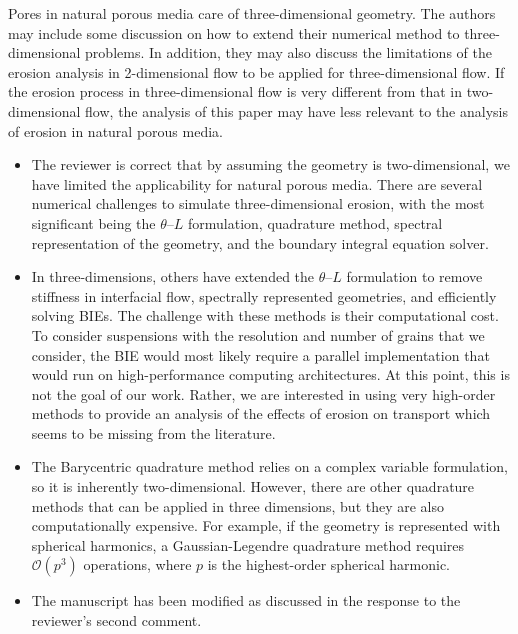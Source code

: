 \documentclass[11pt]{article}
\newcommand{\comment}[1]{{\color{blue} #1}}
\begin{document}
\noindent
\comment{Pores in natural porous media care of three-dimensional
geometry.  The authors may include some discussion on how to extend
their numerical method to three-dimensional problems.  In addition, they
may also discuss the limitations of the erosion analysis in
2-dimensional flow to be applied for three-dimensional flow. If the
erosion process in three-dimensional flow is very different from that in
two-dimensional flow, the analysis of this paper may have less relevant
to the analysis of erosion in natural porous media.}
\begin{itemize}
  \item The reviewer is correct that by assuming the geometry is
    two-dimensional, we have limited the applicability for natural
    porous media. There are several numerical challenges to simulate
    three-dimensional erosion, with the most significant being the
    $\theta$--$L$ formulation, quadrature method, spectral
    representation of the geometry, and the boundary integral equation
    solver.

  \item In three-dimensions, others have extended the $\theta$--$L$
    formulation to remove stiffness in interfacial flow, spectrally
    represented geometries, and efficiently solving BIEs.  The challenge
    with these methods is their computational cost. To consider
    suspensions with the resolution and number of grains that we
    consider, the BIE would most likely require a parallel
    implementation that would run on high-performance computing
    architectures. At this point, this is not the goal of our work.
    Rather, we are interested in using very high-order methods to
    provide an analysis of the effects of erosion on transport which
    seems to be missing from the literature.

  \item The Barycentric quadrature method relies on a complex variable
    formulation, so it is inherently two-dimensional. However, there are
    other quadrature methods that can be applied in three dimensions,
    but they are also computationally expensive. For example, if the
    geometry is represented with spherical harmonics, a
    Gaussian-Legendre quadrature method requires $\mathcal{O}(p^3)$
    operations, where $p$ is the highest-order spherical harmonic.

  \item The manuscript has been modified as discussed in the response to
    the reviewer's second comment.
\end{itemize}
\end{document}
